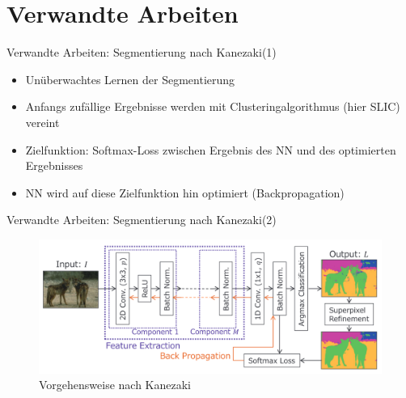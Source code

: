 \documentclass[9pt]{beamer}
\begin{document}
\section{Verwandte Arbeiten}

\begin{frame}{Verwandte Arbeiten: Segmentierung nach Kanezaki\footnotemark[1] (1)}
\begin{itemize}
	\item Unüberwachtes Lernen der Segmentierung
	\item Anfangs zufällige Ergebnisse werden mit Clusteringalgorithmus (hier SLIC\footnotemark[2]) vereint
	\item Zielfunktion: Softmax-Loss zwischen Ergebnis des NN und des optimierten Ergebnisses
	\item NN wird auf diese Zielfunktion hin optimiert (Backpropagation)
\end{itemize}
\end{frame}

\begin{frame}{Verwandte Arbeiten: Segmentierung nach Kanezaki\footnotemark[1] (2)}
\begin{figure}
	\includegraphics[width=\textwidth,keepaspectratio]{kanezaki.png}
	\caption{Vorgehensweise nach Kanezaki}
\end{figure}
\end{frame}
\end{document}
